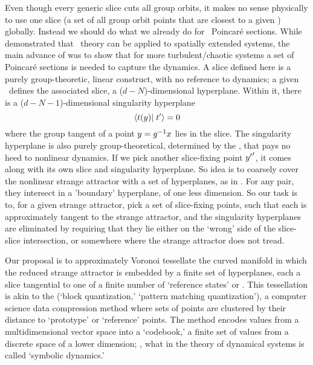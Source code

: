 Even though every generic
slice cuts all group orbits, it makes no sense physically to
use one slice
(a set of all group orbit points that are closest to a given {\template})
globally. Instead we should do what we
already do for \KS\ Poincar\'e sections. While  demonstrated
that \po\ theory can be applied to spatially extended systems, the
main advance of
 was to show that for more turbulent/chaotic systems a set
of Poincar\'e sections is needed to capture the dynamics.
A slice defined here is a purely group-theoretic, linear construct, with no reference
to dynamics; a given {\template} \slicep\ defines
the associated slice, a ($d\!-\!N$)-dimensional hyperplane.
Within it, there is a ($d\!-\!N\!-1$)-dimensional
singularity hyperplane
\[
\braket{\groupTan(\sspRed)}{\sliceTan{}}=0
\]
where the group tangent of a point
$y=g^{-1} x$ lies in the slice. The singularity hyperplane
is also purely group-theoretical,
determined by the {\template} \slicep,
that pays no heed to nonlinear dynamics. If we pick another
slice-fixing point ${y'}'$, it comes along with its own slice
and singularity hyperplane. So idea is to coarsely cover the nonlinear
strange attractor with a set of hyperplanes, as in .
For any pair, they intersect in a 'boundary' hyperplane, of one less dimension.
So our task is to, for a given strange attractor, pick a set of slice-fixing
points, such that each is approximately tangent to the strange attractor,
and the singularity hyperplanes are eliminated by requiring that they
lie either on the `wrong' side of the slice-slice intersection, or somewhere where
the strange attractor does not tread.

Our proposal is to approximately
 {Voronoi
tessellate}  the curved manifold in which the reduced strange attractor
is embedded by a finite set of hyperplanes, each a slice
tangential to one of a finite number of `reference states' or
{\template}. This tessellation is akin to the
 (`block quantization,'  `pattern matching quantization'),
a computer science data compression method where sets of points are
clustered by their distance to `prototype' or `reference' points. The
method encodes values from a multidimensional vector space into a
`codebook,' a finite set of values from a discrete space of a lower
dimension; \ie, what in the theory of dynamical systems is called
`symbolic dynamics.'

